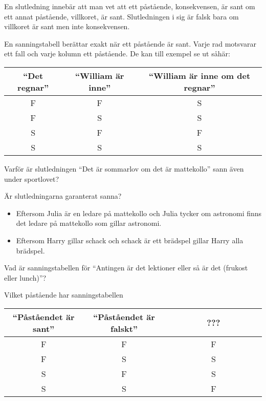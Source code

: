 \begin{definition}[Slutledning]
	En slutledning innebär att man vet att ett påstående, konsekvensen, är sant om ett annat påstående, villkoret, är sant. Slutledningen i sig är falsk bara om villkoret är sant men inte konsekvensen.
\end{definition}

\begin{definition}[Sanningstabell] %
	En sanningstabell berättar exakt när ett påstående är sant. Varje rad motsvarar ett fall och varje kolumn ett påstående. De kan till exempel se ut såhär:
	\begin{center}
		\begin{tabular}{|c|c|c|}
			\hline
			``Det regnar'' & ``William är inne'' & ``William är inne om det regnar'' \\ \hline
			F & F & S \\ \hline
			F & S & S \\ \hline
			S & F & F \\ \hline
			S & S & S \\ \hline
		\end{tabular}
	\end{center}
\end{definition}

\begin{problem}
	Varför är slutledningen ``Det är sommarlov om det är mattekollo'' sann även under sportlovet?
\end{problem}

\begin{problem}
	Är slutledningarna garanterat sanna?
	\begin{itemize}
		\item Eftersom Julia är en ledare på mattekollo och Julia tycker om astronomi finns det ledare på mattekollo som gillar astronomi.
		\item Eftersom Harry gillar schack och schack är ett brädspel gillar Harry alla brädspel.
	\end{itemize}
\end{problem}

\begin{problem}
	Vad är sanningstabellen för ``Antingen är det lektioner eller så är det (frukost eller lunch)''?
\end{problem}

\begin{problem}
	Vilket påstående har sanningstabellen
	\begin{center}
		\begin{tabular}{|c|c|c|}
			\hline
			``Påståendet är sant'' & ``Påståendet är falskt'' & ~~~~~~~~???~~~~~~~~ \\ \hline
			F & F & F \\ \hline
			F & S & S \\ \hline
			S & F & S \\ \hline
			S & S & F \\ \hline
		\end{tabular}
	\end{center}
\end{problem}


